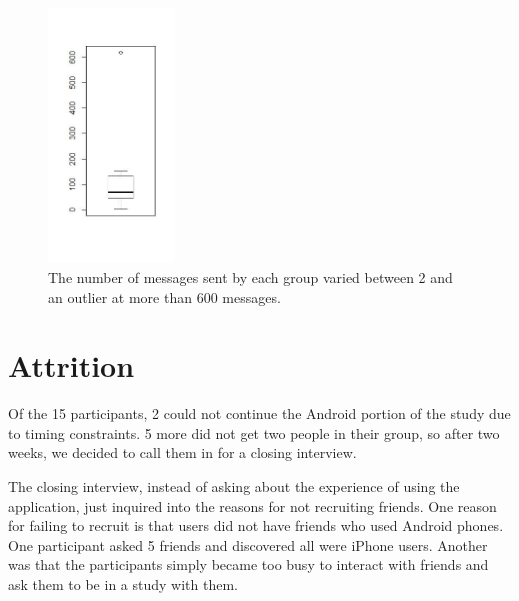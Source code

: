     \begin{figure}
    \centering
    \includegraphics[width=0.3\textwidth]{messages_per_group.jpeg}
    \caption[Messages Sent by Groups]{
      The number of messages sent by each group varied between
      2 and an outlier at more than 600 messages.
    }
    \label{fig:topic_hours}
    \end{figure}

  \section{Attrition}
  \label{sec:Android}
  Of the 15 participants, 2 could not continue the Android portion
  of the study due to timing constraints.
  5 more did not get two people in their group,
  so after two weeks,
  we decided to call them in for a closing interview.

  The closing interview, instead of asking about the experience of using
  the application, just inquired into the reasons for not recruiting friends.
  One reason for failing to recruit is that users did not have friends
  who used Android phones.
  One participant asked 5 friends and discovered all were iPhone users.
  Another was that the participants simply became too busy to interact with
  friends and ask them to be in a study with them.
